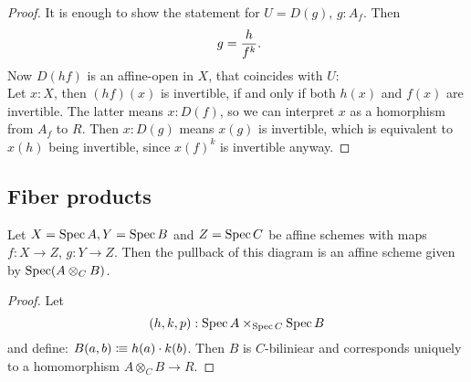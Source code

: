 \begin{proof}
  It is enough to show the statement for $U=D(g)$, $g:A_f$.
  Then
  \[ g=\frac{h}{f^k}\rlap{.}\]
  Now $D(hf)$ is an affine-open in $X$,
  that coincides with $U$: \\
  Let $x:X$, then $(hf)(x)$ is invertible, if and only if both $h(x)$ and $f(x)$ are invertible.
  The latter means $x:D(f)$, so we can interpret $x$ as a homorphism from $A_f$ to $R$.
  Then $x:D(g)$ means $x(g)$ is invertible, which is equivalent to $x(h)$ being invertible,
  since $x(f)^k$ is invertible anyway.
\end{proof}

\subsection{Fiber products}

\begin{lemma}
  Let $X=\operatorname{Spec} A,Y=\operatorname{Spec} B$ and $Z=\operatorname{Spec} C$ be affine schemes with maps $f:X\to Z$, $g:Y\to Z$.
  Then the pullback of this diagram is an affine scheme given by $\operatorname{Spec} (A\otimes_C B)$.
\end{lemma}

\begin{proof}
  Let
  \[ (h,k,p) : \operatorname{Spec} A \times_{\operatorname{Spec} C} \operatorname{Spec} B \]
  and define: $B(a,b)\vcentcolon\mspace{-1.2mu}\equiv h(a)\cdot k(b)$.
  Then $B$ is $C$-biliniear and corresponds uniquely to a homomorphism $A\otimes_C B \to R$.
\end{proof}